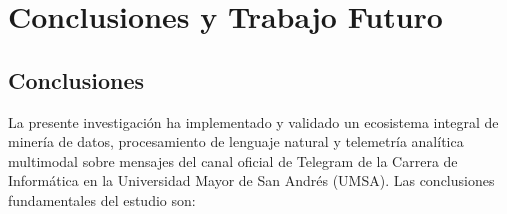 \section{Conclusiones y Trabajo Futuro}
\label{sec:conclusiones}

\subsection{Conclusiones}

La presente investigación ha implementado y validado un ecosistema integral de minería de datos, procesamiento de lenguaje natural y telemetría analítica multimodal sobre \nMensajes{} mensajes del canal oficial de Telegram de la Carrera de Informática en la Universidad Mayor de San Andrés (UMSA). Las conclusiones fundamentales del estudio son:

